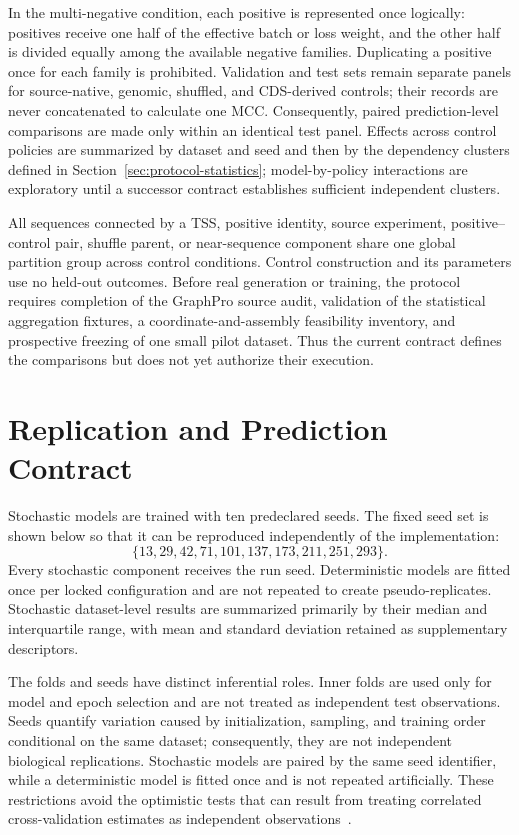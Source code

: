 In the multi-negative condition, each positive is represented once logically:
positives receive one half of the effective batch or loss weight, and the other
half is divided equally among the available negative families. Duplicating a
positive once for each family is prohibited. Validation and test sets remain
separate panels for source-native, genomic, shuffled, and CDS-derived controls;
their records are never concatenated to calculate one MCC. Consequently,
paired prediction-level comparisons are made only within an identical test
panel. Effects across control policies are summarized by dataset and seed and
then by the dependency clusters defined in
Section~\ref{sec:protocol-statistics}; model-by-policy interactions are
exploratory until a successor contract establishes sufficient independent
clusters.

All sequences connected by a TSS, positive identity, source experiment,
positive--control pair, shuffle parent, or near-sequence component share one
global partition group across control conditions. Control construction and its
parameters use no held-out outcomes. Before real generation or training, the
protocol requires completion of the GraphPro source audit, validation of the
statistical aggregation fixtures, a coordinate-and-assembly feasibility
inventory, and prospective freezing of one small pilot dataset. Thus the
current contract defines the comparisons but does not yet authorize their
execution.

\section{Replication and Prediction Contract}\label{sec:protocol-replication}

Stochastic models are trained with ten predeclared seeds. The fixed seed set is
shown below so that it can be reproduced independently of the implementation:
\[
  \{13,29,42,71,101,137,173,211,251,293\}.
\]
Every stochastic component receives the run seed. Deterministic models are
fitted once per locked configuration and are not repeated to create
pseudo-replicates. Stochastic dataset-level results are summarized primarily by
their median and interquartile range, with mean and standard deviation retained
as supplementary descriptors.

The folds and seeds have distinct inferential roles. Inner folds are used only
for model and epoch selection and are not treated as independent test
observations. Seeds quantify variation caused by initialization, sampling, and
training order conditional on the same dataset; consequently, they are not
independent biological replications. Stochastic models are paired by the same
seed identifier, while a deterministic model is fitted once and is not repeated
artificially. These restrictions avoid the optimistic tests that can result
from treating correlated cross-validation estimates as independent
observations~\cite{dietterich1998approximate}.

